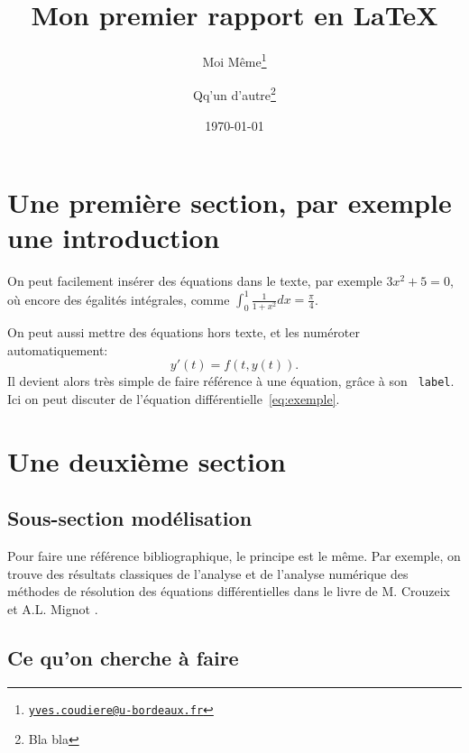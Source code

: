\documentclass[a4paper,12pt,twoside]{report}
\title{Mon premier rapport en \LaTeX}
\author{
  Moi Même\thanks{\href{mailto:yves.coudiere@u-bordeaux.fr}{\tt yves.coudiere@u-bordeaux.fr}}
  \and
  Qq'un d'autre\thanks{Bla bla}
}
\date{\today} %
\begin{document}
\maketitle %

\cleardoublepage
\tableofcontents %

\cleardoublepage
\chapter{Une première section, par exemple une introduction}

On peut facilement insérer des équations dans le texte, par exemple
$3x^2+5 = 0$, où encore des égalités intégrales, comme
$\int_0^1 \frac{1}{1+x^2} dx = \frac{\pi}{4}$.


On peut aussi mettre des équations hors texte, et les numéroter automatiquement:
\begin{equation}
  \label{eq:exemple}
  y'(t) = f(t,y(t)).
\end{equation}
Il devient alors très simple de faire référence à une équation, grâce à son {\tt
  label}. Ici on peut discuter de l'équation différentielle~\eqref{eq:exemple}.

\cleardoublepage
\chapter{Une deuxième section}

\section{Sous-section modélisation}

Pour faire une référence bibliographique, le principe est le même. Par exemple,
on trouve des résultats classiques de l'analyse et de l'analyse numérique des
méthodes de résolution des équations différentielles dans le  livre de
M. Crouzeix et A.L. Mignot \cite{crouzeixmignot}.

\section{Ce qu'on cherche à faire}
\end{document}
